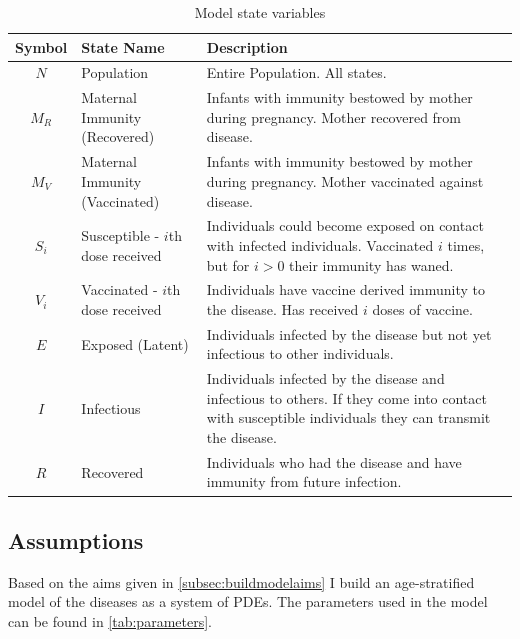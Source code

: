 \documentclass[a4paper,11pt] {scrartcl}
\begin{document}
\begin{table} [h]
\centering
\begin{tabular}{c p{55mm} p{85mm}}
\toprule
Symbol & State Name & Description\\
\midrule
$N$ & Population & Entire Population. All states.\\
$M_R$ & Maternal Immunity (Recovered) & Infants with immunity bestowed by mother during pregnancy. Mother recovered from disease.\\
$M_V$ & Maternal Immunity (Vaccinated) & Infants with immunity bestowed by mother during pregnancy. Mother vaccinated against disease.\\
$S_{i}$& Susceptible - $i$th dose received &Individuals could become exposed on contact with infected individuals. Vaccinated $i$ times, but for $i>0$ their immunity has waned.\\
$V_{i}$& Vaccinated - $i$th dose received& Individuals have vaccine derived immunity to the disease. Has received $i$ doses of vaccine. \\
$E$& Exposed (Latent) & Individuals infected by the disease but not yet infectious to other individuals.\\
$I$& Infectious & Individuals infected by the disease and infectious to others. If they come into contact with susceptible individuals they can transmit the disease. \\
$R$& Recovered & Individuals who had the disease and have immunity from future infection. \\
\bottomrule
\end{tabular}
\caption{Model state variables}
\label{tab:modelstatevariables}
\end{table}

\subsection{Assumptions}
\label{subsec:buildmodelassumptions}
Based on the aims given in \autoref{subsec:buildmodelaims} I build an age-stratified model of the diseases as a system of PDEs. The parameters used in the model can be found in \autoref{tab:parameters}.
\end{document}
